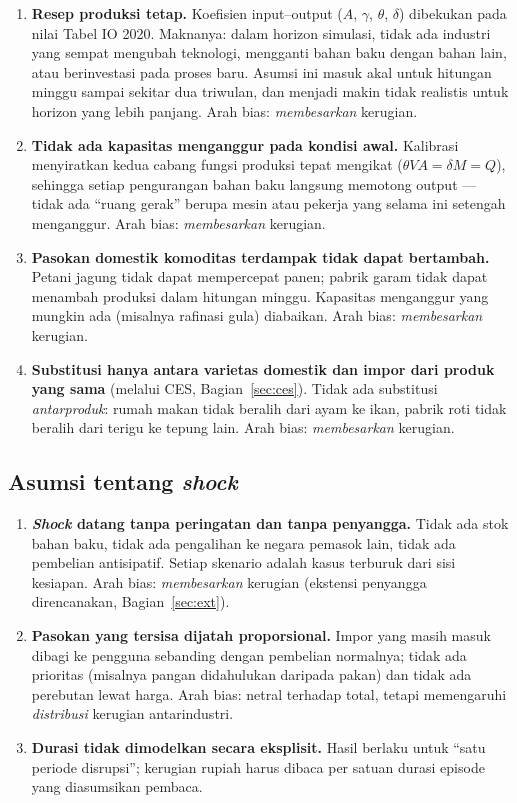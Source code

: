 \documentclass[11pt,a4paper]{article}
\newcommand{\en}[1]{\textit{#1}}   %
\begin{document}
\begin{enumerate}[nosep]
\item \textbf{Resep produksi tetap.} Koefisien input--output ($A$,
      $\gamma$, $\theta$, $\delta$) dibekukan pada nilai Tabel IO 2020.
      Maknanya: dalam horizon simulasi, tidak ada industri yang sempat
      mengubah teknologi, mengganti bahan baku dengan bahan lain, atau
      berinvestasi pada proses baru. Asumsi ini masuk akal untuk
      hitungan minggu sampai sekitar dua triwulan, dan menjadi makin
      tidak realistis untuk horizon yang lebih panjang. Arah bias:
      \emph{membesarkan} kerugian.
\item \textbf{Tidak ada kapasitas menganggur pada kondisi awal.}
      Kalibrasi menyiratkan kedua cabang fungsi produksi tepat mengikat
      ($\theta VA = \delta M = Q$), sehingga setiap pengurangan bahan
      baku langsung memotong output --- tidak ada ``ruang gerak'' berupa
      mesin atau pekerja yang selama ini setengah menganggur. Arah bias:
      \emph{membesarkan} kerugian.
\item \textbf{Pasokan domestik komoditas terdampak tidak dapat
      bertambah.} Petani jagung tidak dapat mempercepat panen; pabrik
      garam tidak dapat menambah produksi dalam hitungan minggu.
      Kapasitas menganggur yang mungkin ada (misalnya rafinasi gula)
      diabaikan. Arah bias: \emph{membesarkan} kerugian.
\item \textbf{Substitusi hanya antara varietas domestik dan impor dari
      produk yang sama} (melalui CES, Bagian~\ref{sec:ces}). Tidak ada
      substitusi \emph{antarproduk}: rumah makan tidak beralih dari ayam
      ke ikan, pabrik roti tidak beralih dari terigu ke tepung lain.
      Arah bias: \emph{membesarkan} kerugian.
\end{enumerate}

\subsection{Asumsi tentang \en{shock}}

\begin{enumerate}
\item \textbf{\en{Shock} datang tanpa peringatan dan tanpa penyangga.}
      Tidak ada stok bahan baku, tidak ada pengalihan ke negara pemasok
      lain, tidak ada pembelian antisipatif. Setiap skenario adalah
      kasus terburuk dari sisi kesiapan. Arah bias: \emph{membesarkan}
      kerugian (ekstensi penyangga direncanakan,
      Bagian~\ref{sec:ext}).
\item \textbf{Pasokan yang tersisa dijatah proporsional.} Impor yang
      masih masuk dibagi ke pengguna sebanding dengan pembelian
      normalnya; tidak ada prioritas (misalnya pangan didahulukan
      daripada pakan) dan tidak ada perebutan lewat harga. Arah bias:
      netral terhadap total, tetapi memengaruhi \emph{distribusi}
      kerugian antarindustri.
\item \textbf{Durasi tidak dimodelkan secara eksplisit.} Hasil berlaku
      untuk ``satu periode disrupsi''; kerugian rupiah harus dibaca per
      satuan durasi episode yang diasumsikan pembaca.
\end{enumerate}
\end{document}
